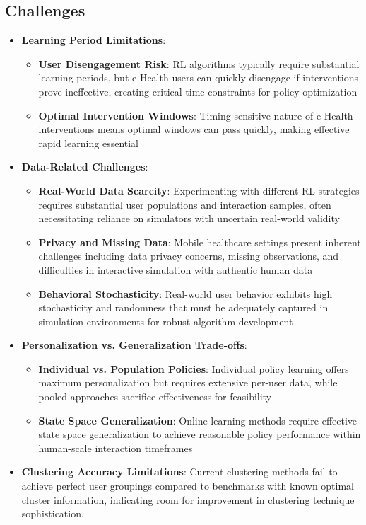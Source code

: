 \subsection*{Challenges}
\begin{itemize}
    \item \textbf{Learning Period Limitations}:
    \begin{itemize}
        \item \textbf{User Disengagement Risk}: RL algorithms typically require substantial learning periods, but e-Health users can quickly disengage if interventions prove ineffective, creating critical time constraints for policy optimization
        \item \textbf{Optimal Intervention Windows}: Timing-sensitive nature of e-Health interventions means optimal windows can pass quickly, making effective rapid learning essential
    \end{itemize}
    \item \textbf{Data-Related Challenges}:
    \begin{itemize}
        \item \textbf{Real-World Data Scarcity}: Experimenting with different RL strategies requires substantial user populations and interaction samples, often necessitating reliance on simulators with uncertain real-world validity
        \item \textbf{Privacy and Missing Data}: Mobile healthcare settings present inherent challenges including data privacy concerns, missing observations, and difficulties in interactive simulation with authentic human data
        \item \textbf{Behavioral Stochasticity}: Real-world user behavior exhibits high stochasticity and randomness that must be adequately captured in simulation environments for robust algorithm development
    \end{itemize}
    \item \textbf{Personalization vs. Generalization Trade-offs}:
    \begin{itemize}
        \item \textbf{Individual vs. Population Policies}: Individual policy learning offers maximum personalization but requires extensive per-user data, while pooled approaches sacrifice effectiveness for feasibility
        \item \textbf{State Space Generalization}: Online learning methods require effective state space generalization to achieve reasonable policy performance within human-scale interaction timeframes
    \end{itemize}
    \item \textbf{Clustering Accuracy Limitations}: Current clustering methods fail to achieve perfect user groupings compared to benchmarks with known optimal cluster information, indicating room for improvement in clustering technique sophistication.
\end{itemize}

